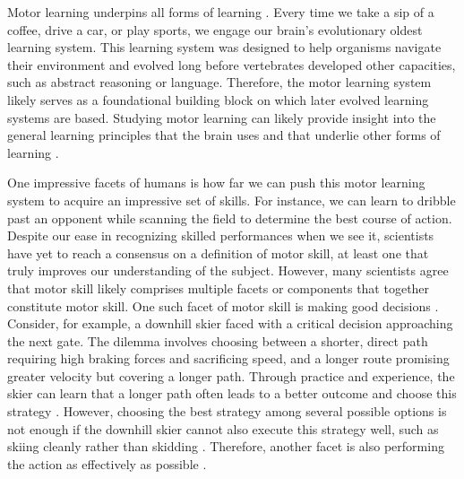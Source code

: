 Motor learning underpins all forms of learning \cite{shadmehr_computational_2004}. Every time we take a sip of a coffee, drive a car, or play sports, we engage our brain's evolutionary oldest learning system. This learning system was designed to help organisms navigate their environment and evolved long before vertebrates developed other capacities, such as abstract reasoning or language. Therefore, the motor learning system likely serves as a foundational building block on which later evolved learning systems are based. Studying motor learning can likely provide insight into the general learning principles that the brain uses and that underlie other forms of learning \cite{shadmehr_computational_2004}.

One impressive facets of humans is how far we can push this motor learning system to acquire an impressive set of skills. For instance, we can learn to dribble past an opponent while scanning the field to determine the best course of action. Despite our ease in recognizing skilled performances when we see it,  scientists have yet to reach a consensus on a definition of motor skill, at least one that truly improves our understanding of the subject\cite{du_relationship_2022, shadmehr_computational_2004}. However, many scientists agree that motor skill likely comprises multiple facets or components that together constitute motor skill\cite{wolpert_principles_2011, wolpert_motor_2010, wolpert_perspectives_2001, du_relationship_2022, chen_effects_2018, diedrichsen_motor_2015, stanley_motor_2013, gallivan_decision-making_2018, krakauer_motor_2019, makino_circuit_2016}. One such facet of motor skill is making good decisions \cite{gallivan_decision-making_2018, du_relationship_2022, wolpert_motor_2010}. Consider, for example, a downhill skier faced with a critical decision approaching the next gate. The dilemma involves choosing between a shorter, direct path requiring high braking forces and sacrificing speed, and a longer route promising greater velocity but covering a longer path. Through practice and experience, the skier can learn that a longer path often leads to a better outcome and choose this strategy \cite{supej_differential_2008, lesnik_best_2007, federolf_quantifying_2012}. However, choosing the best strategy among several possible options is not enough if the downhill skier cannot also execute this strategy well, such as skiing cleanly rather than skidding \cite{reid_kinematic_2010, reid_turn_2009}. Therefore, another facet is also performing the action as effectively as possible \cite{du_relationship_2022, wolpert_perspectives_2001}.

